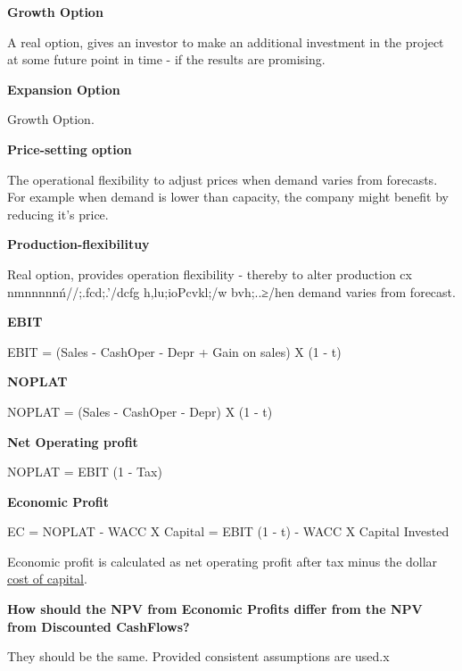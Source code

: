 \documentclass[12pt]{article}
\begin{document}
							 			\textbf{Growth Option}
							 			
							 			A real option, gives an investor to make an additional investment in the project at some future point in time - if the results are promising.
							 			
							 			\textbf{Expansion Option}
							 			
							 			Growth Option.
							 			
							 			\textbf{Price-setting option}
							 			
							 			The operational flexibility to adjust prices when demand varies from forecasts. For example when demand is lower than capacity,                  
							 			the company might benefit by reducing it's price. 
							 			
							 			\textbf{Production-flexibilituy}
							 			
							 			Real option, provides operation flexibility - thereby to alter production  cx nmnnnnnń//;.fcd;.'/dcfg h,lu;ioPcvkl;/w bvh;..≥/hen demand varies from forecast.
							 			
							 			\textbf{EBIT}
							 			
							 			EBIT = (Sales - CashOper - Depr + Gain on sales) X (1 - t)
							 			
							 			\textbf{NOPLAT}
							 			
							 			NOPLAT = (Sales - CashOper - Depr) X (1 - t)
							 			
							 			\textbf{Net Operating profit}
							 			
							 			NOPLAT = EBIT (1 - Tax)
							 			
							 			\textbf{Economic Profit}
							 			
							 			EC = NOPLAT - WACC X Capital = EBIT (1 - t) - WACC X Capital Invested
							 			
							 			Economic profit is calculated as net operating profit after tax minus the dollar \underline{cost of capital}.
							 			
							 			\textbf{How should the NPV from Economic Profits differ from the NPV from Discounted CashFlows?}
							 			
							 			They should be the same. Provided consistent assumptions are used.x
							 			
\end{document}
